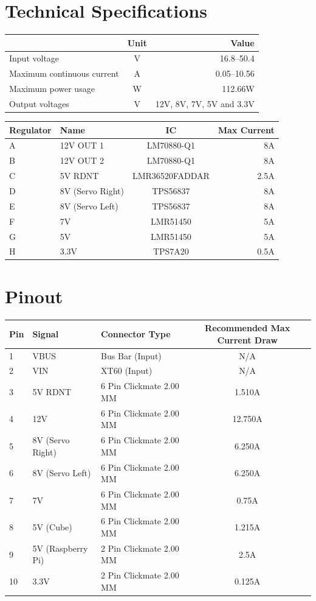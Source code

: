 \documentclass[a4paper,12pt,oneside,final]{article}
\begin{document}
\section{Technical Specifications}
\begin{center}
  \begin{tabular}{lcr}
    \toprule
                   & Unit & Value \\
    \midrule
    Input voltage  & V    & 16.8--50.4 \\
    Maximum continuous current  &   A   & 0.05--10.56 \\
    Maximum power usage  &  W    &  112.66W\\ 
     Output voltages  &   V   & 12V, 8V, 7V, 5V and 3.3V \\ 
    \bottomrule
  \end{tabular}
  \begin{tabular}{llcr}
    \toprule
    Regulator & Name & IC &  Max Current \\
    \midrule
       A & 12V OUT 1  & LM70880-Q1 &8A \\
       B & 12V OUT 2  & LM70880-Q1   & 8A \\
       C & 5V RDNT  & LMR36520FADDAR &  2.5A\\ 
       D & 8V (Servo Right)  &  TPS56837  & 8A \\ 
       E & 8V (Servo Left) & TPS56837& 8A \\
       F & 7V & LMR51450 & 5A\\
       G & 5V & LMR51450 & 5A\\
       H & 3.3V & TPS7A20  & 0.5A\\
    \bottomrule
  \end{tabular}
\end{center}

\section{Pinout}
\begin{center}
  \begin{tabular}{lllc}
    \toprule
    Pin & Signal & Connector Type & Recommended Max Current Draw\\
    \midrule
    1 & VBUS & Bus Bar (Input)& N/A\\ 
    2 & VIN & XT60 (Input)& N/A\\
    3 & 5V RDNT & 6 Pin Clickmate 2.00 MM & 1.510A\\
    4 & 12V & 6 Pin Clickmate 2.00 MM & 12.750A\\
    5 & 8V (Servo Right) & 6 Pin Clickmate 2.00 MM & 6.250A\\
    6 & 8V (Servo Left) & 6 Pin Clickmate 2.00 MM & 6.250A\\
    7 & 7V & 6 Pin Clickmate 2.00 MM & 0.75A\\
    8 & 5V (Cube) & 6 Pin Clickmate 2.00 MM & 1.215A\\
    9 & 5V (Raspberry Pi) & 2 Pin Clickmate 2.00 MM & 2.5A\\
    10 & 3.3V & 2 Pin Clickmate 2.00 MM & 0.125A\\
    \bottomrule
  \end{tabular}
\end{center}
\end{document}
